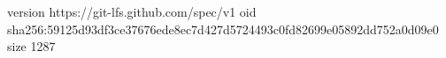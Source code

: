version https://git-lfs.github.com/spec/v1
oid sha256:59125d93df3ce37676ede8ec7d427d5724493c0fd82699e05892dd752a0d09e0
size 1287
